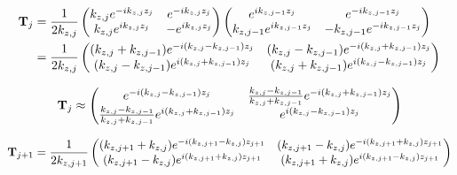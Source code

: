 \begin{align*}
	\vb{T}_j &=
	\frac{1}{2k_{z,j}}\pmqty{
		k_{z,j} e^{-ik_{z,j}z_j} & 
		e^{-ik_{z,j}z_j}  \\
		k_{z,j} e^{ik_{z,j}z_j} & 
		-e^{ik_{z,j}z_j}
		} \pmqty{
	e^{ik_{z,j-1}z_j} & 
	e^{-ik_{z,j-1}z_j}  \\
	k_{z,j-1} e^{ik_{z,j-1}z_j} & 
	-k_{z,j-1} e^{-ik_{z,j-1}z_j}
	}  \\
	&= \frac{1}{2k_{z,j}}\pmqty{
		\pqty{k_{z,j} + k_{z,j-1}}e^{-i\pqty{k_{z,j} - k_{z,j-1}}z_j} &
		\pqty{k_{z,j} - k_{z,j-1}}e^{-i\pqty{k_{z,j} + k_{z,j-1}}z_j}  \\
		\pqty{k_{z,j} - k_{z,j-1}}e^{ i\pqty{k_{z,j} + k_{z,j-1}}z_j} &
		\pqty{k_{z,j} + k_{z,j-1}}e^{ i\pqty{k_{z,j} - k_{z,j-1}}z_j}
		} \\
\end{align*}

\begin{align*}
	\vb{T}_j &\approx \pmqty{
		e^{-i\pqty{k_{z,j} - k_{z,j-1}}z_j} &
		\frac{k_{z,j} - k_{z,j-1}}{k_{z,j} + k_{z,j-1}}e^{-i\pqty{k_{z,j} + k_{z,j-1}}z_j}  \\
		\frac{k_{z,j} - k_{z,j-1}}{k_{z,j} + k_{z,j-1}}e^{ i\pqty{k_{z,j} + k_{z,j-1}}z_j} &
		e^{ i\pqty{k_{z,j} - k_{z,j-1}}z_j}
		} \\
\end{align*}

\begin{align*}
	\vb{T}_{j+1} &= \frac{1}{2k_{z,j+1}}\pmqty{
		\pqty{k_{z,j+1} + k_{z,j}}e^{-i\pqty{k_{z,j+1} - k_{z,j}}z_{j+1}} &
		\pqty{k_{z,j+1} - k_{z,j}}e^{-i\pqty{k_{z,j+1} + k_{z,j}}z_{j+1}}  \\
		\pqty{k_{z,j+1} - k_{z,j}}e^{ i\pqty{k_{z,j+1} + k_{z,j}}z_{j+1}} &
		\pqty{k_{z,j+1} + k_{z,j}}e^{ i\pqty{k_{z,j+1} - k_{z,j}}z_{j+1}}
		} \\
\end{align*}

